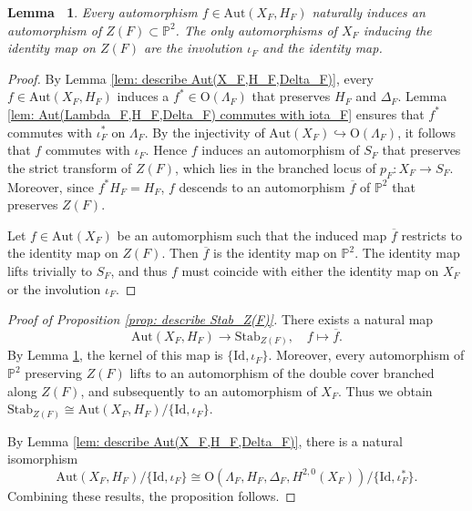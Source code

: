 \documentclass[12pt,reqno,a4paper]{amsart}
\newtheorem{lem}[thm]{Lemma~}
\theoremstyle{remark}
\theoremstyle{definition}
\newcommand{\PP}{\mathbb{P}}
\newcommand\Aut{\mathrm{Aut}}
\newcommand\Id{\mathrm{Id}}
\newcommand\Or{\mathrm{O}}
\newcommand\Stab{\mathrm{Stab}}
\begin{document}
\begin{lem}
\label{lem: Aut(X_F,H_F) to Stab_Z(F)}
    Every automorphism $f\in \Aut(X_F,H_F)$ naturally induces an automorphism of $Z(F)\subset\PP^2$.
    The only automorphisms of $X_F$ inducing the identity map on $Z(F)$ are the involution $\iota_F$ and the identity map.
\end{lem}
\begin{proof}
    By Lemma \ref{lem: describe Aut(X_F,H_F,Delta_F)}, every $f\in \Aut(X_F,H_F)$ induces a $f^*\in\Or(\Lambda_F)$ that preserves $H_F$ and $\Delta_F$. 
    Lemma \ref{lem: Aut(Lambda_F,H_F,Delta_F) commutes with iota_F} ensures that $f^*$ commutes with $\iota_F^*$ on $\Lambda_F$. %
    By the injectivity of $\Aut(X_F)\hookrightarrow\Or(\Lambda_F)$, it follows that $f$ commutes with $\iota_F$.
    Hence $f$ induces an automorphism of $S_F$ that preserves the strict transform of $Z(F)$, which lies in the branched locus of $p_F\colon X_F\to S_F$.
    Moreover, since $f^*H_F=H_F$, $f$ descends to an automorphism $\overline{f}$ of $\PP^2$ that preserves $Z(F)$.

    Let $f\in\Aut(X_F)$ be an automorphism such that the induced map $\overline{f}$ restricts to the identity map on $Z(F)$.
    Then $\overline{f}$ is the identity map on $\PP^2$.
    The identity map lifts trivially to $S_F$, and thus $f$ must coincide with either the identity map on $X_F$ or the involution $\iota_F$.
\end{proof}
\begin{proof}[Proof of Proposition \ref{prop: describe Stab_Z(F)}]
    There exists a natural map 
    \begin{equation*}
        \Aut(X_F,H_F) \to \Stab_{Z(F)}, \quad f\mapsto\overline{f}.
    \end{equation*} 
    By Lemma \ref{lem: Aut(X_F,H_F) to Stab_Z(F)}, the kernel of this map is $\{\Id,\iota_F\}$. Moreover, every automorphism of $\PP^2$ preserving $Z(F)$ lifts to an automorphism of the double cover branched along $Z(F)$, and subsequently to an automorphism of $X_F$. Thus we obtain $\Stab_{Z(F)} \cong \Aut(X_F,H_F)/\{\Id,\iota_F\}$.

    By Lemma \ref{lem: describe Aut(X_F,H_F,Delta_F)}, there is a natural isomorphism
    \begin{equation*}
        \Aut(X_F,H_F)/\{\Id,\iota_F\} \cong \Or(\Lambda_F,H_F,\Delta_F,H^{2,0}(X_F))/\{\Id,\iota_F^*\}.
    \end{equation*}
    Combining these results, the proposition follows.
\end{proof}
\end{document}
